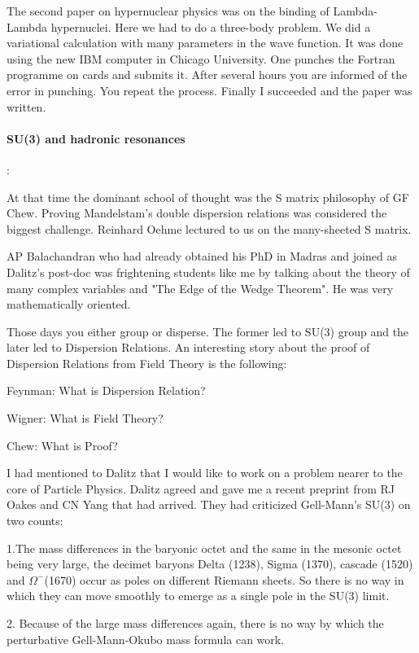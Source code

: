 The second paper on hypernuclear physics was on the binding of 
Lambda-Lambda hypernuclei. Here we had to do a three-body problem. We 
did a variational calculation with many parameters in the wave function. 
It was done using the new IBM computer in Chicago University. One 
punches the Fortran programme on cards and submits it. After several 
hours you are informed of the error in punching. You repeat the process. 
Finally I succeeded and the paper was written.

\paragraph{SU(3) and hadronic resonances}:

At that time the dominant school of thought was the S matrix philosophy 
of GF Chew. Proving Mandelstam's double dispersion relations was 
considered the biggest challenge. Reinhard Oehme lectured to us on the 
many-sheeted S matrix.

AP Balachandran who had already obtained his PhD in Madras and joined as 
Dalitz's post-doc was frightening students like me by talking about the 
theory of many complex variables and "The Edge of the Wedge Theorem". He 
was very mathematically oriented.

Those days you either group or disperse. The former led to SU(3) group 
and the later led to Dispersion Relations. An interesting story about 
the proof of Dispersion Relations from Field Theory is the following:

Feynman: What is Dispersion Relation?

Wigner: What is Field Theory?

Chew: What is Proof?

I had mentioned to Dalitz that I would like to work on a problem nearer 
to the core of Particle Physics. Dalitz agreed and gave me a recent 
preprint from RJ Oakes and CN Yang that had arrived. They had criticized 
Gell-Mann's SU(3) on two counts:

1.The mass differences in the baryonic octet and the same in the mesonic 
octet being very large, the decimet baryons Delta (1238), Sigma (1370), 
cascade (1520) and $\Omega^-$(1670) occur as poles on different Riemann 
sheets. So there is no way in which they can move smoothly to emerge as 
a single pole in the SU(3) limit.

2. Because of the large mass differences again, there is no way by which 
the perturbative Gell-Mann-Okubo mass formula can work.

